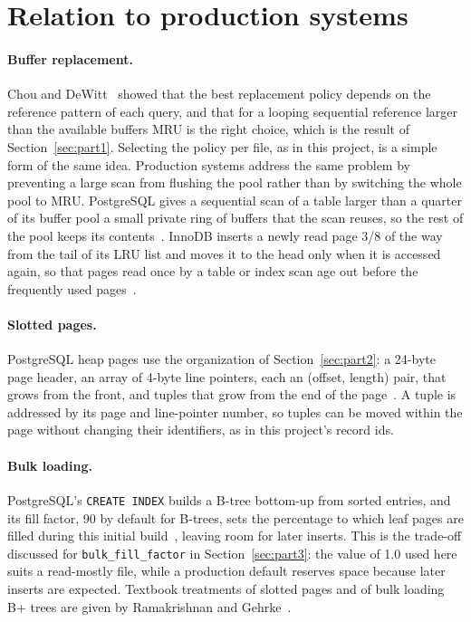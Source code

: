 \documentclass[11pt,a4paper]{article}
\begin{document}
\section{Relation to production systems}
\label{sec:related}

\paragraph{Buffer replacement.} Chou and DeWitt~\cite{chou85} showed that the best replacement policy depends on the reference pattern of each query, and that for a looping sequential reference larger than the available buffers MRU is the right choice, which is the result of Section~\ref{sec:part1}. Selecting the policy per file, as in this project, is a simple form of the same idea. Production systems address the same problem by preventing a large scan from flushing the pool rather than by switching the whole pool to MRU. PostgreSQL gives a sequential scan of a table larger than a quarter of its buffer pool a small private ring of buffers that the scan reuses, so the rest of the pool keeps its contents~\cite{pgbuf}. InnoDB inserts a newly read page 3/8 of the way from the tail of its LRU list and moves it to the head only when it is accessed again, so that pages read once by a table or index scan age out before the frequently used pages~\cite{innodb}.

\paragraph{Slotted pages.} PostgreSQL heap pages use the organization of Section~\ref{sec:part2}: a 24-byte page header, an array of 4-byte line pointers, each an (offset, length) pair, that grows from the front, and tuples that grow from the end of the page~\cite{pgpage}. A tuple is addressed by its page and line-pointer number, so tuples can be moved within the page without changing their identifiers, as in this project's record ids.

\paragraph{Bulk loading.} PostgreSQL's \texttt{CREATE INDEX} builds a B-tree bottom-up from sorted entries, and its fill factor, 90 by default for B-trees, sets the percentage to which leaf pages are filled during this initial build~\cite{pgindex}, leaving room for later inserts. This is the trade-off discussed for \texttt{bulk\_fill\_factor} in Section~\ref{sec:part3}: the value of 1.0 used here suits a read-mostly file, while a production default reserves space because later inserts are expected. Textbook treatments of slotted pages and of bulk loading B+ trees are given by Ramakrishnan and Gehrke~\cite{rg03}.
\end{document}
